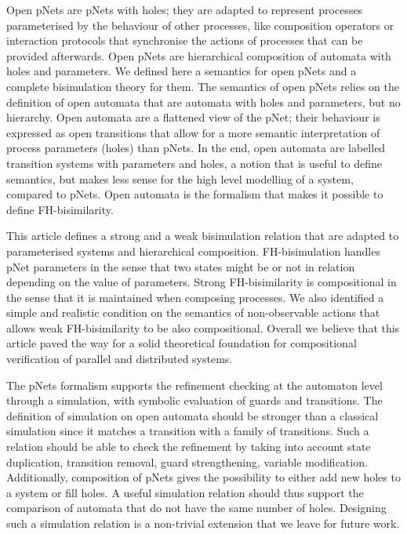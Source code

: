 \documentclass{elsarticle}
\begin{document}
Open pNets are pNets with holes; they are adapted to represent processes parameterised by the behaviour of other processes, like composition operators or interaction 
protocols that synchronise the actions of processes that can be provided afterwards. Open
pNets are hierarchical composition of automata with holes and parameters. We
defined here a semantics for open pNets and a complete bisimulation theory for them. 
The semantics of open pNets relies on the definition of open automata that are automata with holes and parameters, but no hierarchy.  Open automata are a flattened view of the pNet; their behaviour is expressed as open transitions that allow for a more semantic interpretation of process parameters (holes) than pNets. In the end, open automata are  labelled transition systems with parameters and holes, a notion that is useful to define semantics, but makes less sense for the high level modelling of a system, compared to pNets.  Open automata is the formalism that makes it possible to define FH-bisimilarity.

This article defines a strong and a weak bisimulation relation that are adapted to parameterised systems and hierarchical composition.  FH-bisimulation  handles pNet parameters in the sense that two states might be or not in relation depending on the value of parameters. Strong  FH-bisimilarity is compositional  in the sense that it is maintained when composing processes. We also identified a simple and realistic condition on the semantics of non-observable actions that allows weak FH-bisimilarity to be also compositional. Overall we believe that this article paved the way for a solid theoretical foundation for compositional verification of parallel and distributed systems.

The pNets formalism supports the refinement checking at the automaton level through a simulation, with symbolic evaluation of
 guards and transitions. 
 The definition of simulation on open automata should be  stronger than a classical simulation since it matches a transition with a family of transitions. Such a relation should be able to check the refinement by taking into account state duplication,  transition removal,  guard strengthening,  variable modification. Additionally, composition of 
pNets gives the possibility to either add new holes to a system or  fill holes. A useful simulation relation  should thus support the  comparison of automata that do not have the same number of holes. Designing such a simulation relation is a non-trivial extension that we leave for future work.
\end{document}
